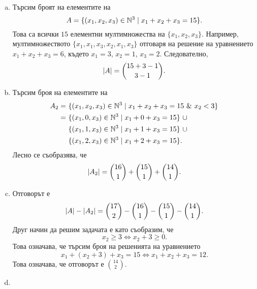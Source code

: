 \begin{solution}
  \begin{enumerate}[a)]
  \item
    Търсим броят на елементите на 
    \[A = \{(x_1,x_2,x_3) \in \mathbb{N}^3\mid x_1 + x_2 + x_3 = 15\}.\]
    Това са всички $15$ елементни мултимножества на  $\{x_1,x_2,x_3\}$.
    Например, мултимножеството $\{x_1,x_1,x_3,x_2,x_1,x_3\}$ отговаря на решение на уравнението $x_1 + x_2 + x_3 = 6$,
    където $x_1 = 3$, $x_2 = 1$, $x_3 = 2$.
    Следователно,
    \[\lvert{A}\rvert = \binom{15 + 3 - 1}{3-1}.\]
  \item
    Търсим броя на елементите на 
    \begin{align*}
      A_2 =\ &\{(x_1,x_2,x_3) \in \Nat^3\mid x_1 + x_2 + x_3 = 15\ \&\ x_2 < 3\}\\
      =\ & \{(x_1,0,x_3) \in \Nat^3\mid x_1 + 0 + x_3 = 15\}\ \cup \\ 
      & \{(x_1,1,x_3) \in \Nat^3\mid x_1 + 1 + x_3 = 15\}\ \cup \\ 
      & \{(x_1,2,x_3) \in \Nat^3\mid x_1 + 2 + x_3 = 15\}.
    \end{align*}
    Лесно се съобразява, че
    \[\lvert{A_2}\rvert = \binom{16}{1} + \binom{15}{1} + \binom{14}{1}.\]
  \item
    Отговорът е
    \[\lvert{A}\rvert - \lvert{A_2}\rvert = \binom{17}{2} - \binom{16}{1} - \binom{15}{1} - \binom{14}{1}.\]
    Друг начин да решим задачата е като съобразим, че 
    \[x_2 \geq 3 \iff x_2 + 3 \geq 0.\]
    Това означава, че търсим броя на решенията на уравнението
    \[x_1 + (x_2 + 3) + x_3 = 15 \iff x_1 + x_2 + x_3 = 12.\]
    Това означава, че отговорът е $\binom{14}{2}$.
  \item


\end{enumerate}
\end{solution}
